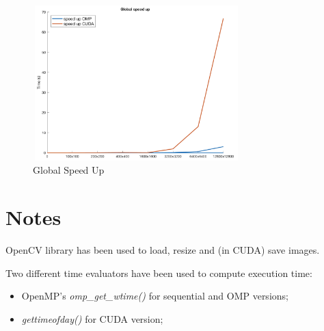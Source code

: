 \documentclass[10pt,twocolumn,letterpaper]{article}
\begin{document}
\begin{figure}[h]
	\centering
	\includegraphics[width=8cm, height=6cm]{global_speed_up}
	\caption{Global Speed Up}
	\label{fig:glob-s-u}
\end{figure}

\section{Notes}
OpenCV library has been used to load, resize and (in CUDA) save images.

Two different time evaluators have been used to compute execution time:
	\begin{itemize}
		\item OpenMP's  \textit{omp\_get\_wtime()} for sequential and OMP versions;
		\item \textit{gettimeofday()} for CUDA version;
	\end{itemize}
\end{document}
